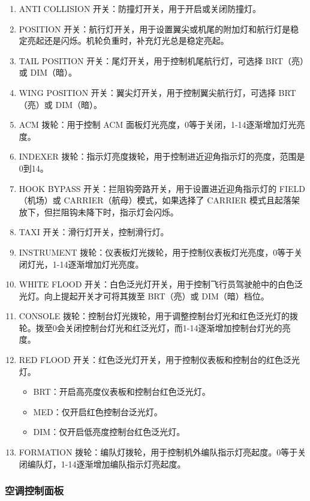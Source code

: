 \begin{enumerate}
	\item ANTI COLLISION 开关：防撞灯开关，用于开启或关闭防撞灯。
	\item POSITION 开关：航行灯开关，用于设置翼尖或机尾的附加灯和航行灯是稳定亮起还是闪烁。机轮负重时，补充灯光总是稳定亮起。
	\item TAIL POSITION 开关：尾灯开关，用于控制机尾航行灯，可选择 BRT（亮）或 DIM（暗）。
	\item WING POSITION 开关：翼尖灯开关，用于控制翼尖航行灯，可选择 BRT（亮）或 DIM（暗）。
	\item ACM 拨轮：用于控制 ACM 面板灯光亮度，0等于关闭，1-14逐渐增加灯光亮度。
	\item INDEXER 拨轮：指示灯亮度拨轮，用于控制进近迎角指示灯的亮度，范围是0到14。
	\item HOOK BYPASS 开关：拦阻钩旁路开关，用于设置进近迎角指示灯的 FIELD（机场）或 CARRIER（航母）模式，如果选择了 CARRIER 模式且起落架放下，但拦阻钩未降下时，指示灯会闪烁。
	\item TAXI 开关：滑行灯开关，控制滑行灯。
	\item INSTRUMENT 拨轮：仪表板灯光拨轮，用于控制仪表板灯光亮度，0等于关闭灯光，1-14逐渐增加灯光亮度。
	\item WHITE FLOOD 开关：白色泛光灯开关，用于控制飞行员驾驶舱中的白色泛光灯。向上提起开关才可将其拨至 BRT（亮）或 DIM（暗）档位。
	\item CONSOLE 拨轮：控制台灯光拨轮，用于调整控制台灯光和红色泛光灯的拨轮。拨至0会关闭控制台灯光和红泛光灯，而1-14逐渐增加控制台灯光的亮度。
	\item RED FLOOD 开关：红色泛光灯开关，用于控制仪表板和控制台的红色泛光灯。
	      \begin{itemize}
		      \item BRT：开启高亮度仪表板和控制台红色泛光灯。
		      \item MED：仅开启红色控制台泛光灯。
		      \item DIM：仅开启低亮度控制台红色泛光灯。
	      \end{itemize}
	\item FORMATION 拨轮：编队灯拨轮，用于控制机外编队指示灯亮起度。0等于关闭编队灯，1-14逐渐增加编队指示灯亮起度。
\end{enumerate}

\subsubsection{空调控制面板}

